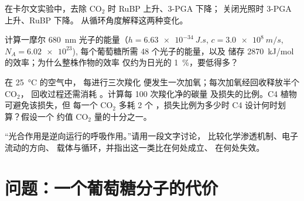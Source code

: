 \begin{exercise}[$\star\star$]\label{exo:b1:photosynthesis:9}
在卡尔文实验中，去除 $\mathrm{CO_2}$ 时 RuBP 上升、3-PGA 下降；
关闭光照时 3-PGA 上升、RuBP 下降。
从循环角度解释这两种变化。
\end{exercise}

\begin{exercise}[$\star\star\star$]\label{exo:b1:photosynthesis:10}
计算一摩尔 \qty{680}{nm} 光子的能量（$h =
\qty{6.63e-34}{J.s}$, $c = \qty{3.0e8}{m/s}$, $N_A = \num{6.02e23}$),
每个葡萄糖所需 48 个光子的能量，以及
储存 \qty{2870}{kJ/mol} 的效率；为什么整株作物的效率
仅约为日光的 \qty{1}{\%}，要低得多？
\end{exercise}

\begin{exercise}[$\star\star\star$]\label{exo:b1:photosynthesis:11}
在 \qty{25}{\celsius} 的空气中， 每进行三次羧化
便发生一次加氧；每次加氧经回收释放半个 $\mathrm{CO_2}$，
回收过程还需消耗 。计算每 100 次羧化净的碳量
及损失的比例。C4 植物可避免该损失，但
每一个 $\mathrm{CO_2}$ 多耗 2 个 ，损失比例为多少时
C4 设计何时划算？假设一个  约值 $\mathrm{CO_2}$
量的十分之一。
\end{exercise}

\begin{exercise}[$\star\star\star$]\label{exo:b1:photosynthesis:12}
“光合作用是逆向运行的呼吸作用。”请用一段文字讨论，
比较化学渗透机制、电子流动的方向、
载体与循环，并指出这一类比在何处成立、
在何处失效。
\end{exercise}

\section{问题：一个葡萄糖分子的代价}

